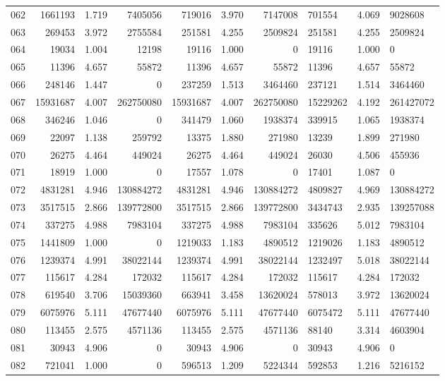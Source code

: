 \begin{longtable}{crrrrrr}
062 & 1661193 & 1.719 & 7405056 & 719016 & 3.970 & 7147008 & 701554 & 4.069 & 9028608 \\
063 & 269453 & 3.972 & 2755584 & 251581 & 4.255 & 2509824 & 251581 & 4.255 & 2509824 \\
064 & 19034 & 1.004 & 12198 & 19116 & 1.000 & 0 & 19116 & 1.000 & 0 \\
065 & 11396 & 4.657 & 55872 & 11396 & 4.657 & 55872 & 11396 & 4.657 & 55872 \\
066 & 248146 & 1.447 & 0 & 237259 & 1.513 & 3464460 & 237121 & 1.514 & 3464460 \\
067 & 15931687 & 4.007 & 262750080 & 15931687 & 4.007 & 262750080 & 15229262 & 4.192 & 261427072 \\
068 & 346246 & 1.046 & 0 & 341479 & 1.060 & 1938374 & 339915 & 1.065 & 1938374 \\
069 & 22097 & 1.138 & 259792 & 13375 & 1.880 & 271980 & 13239 & 1.899 & 271980 \\
070 & 26275 & 4.464 & 449024 & 26275 & 4.464 & 449024 & 26030 & 4.506 & 455936 \\
071 & 18919 & 1.000 & 0 & 17557 & 1.078 & 0 & 17401 & 1.087 & 0 \\
072 & 4831281 & 4.946 & 130884272 & 4831281 & 4.946 & 130884272 & 4809827 & 4.969 & 130884272 \\
073 & 3517515 & 2.866 & 139772800 & 3517515 & 2.866 & 139772800 & 3434743 & 2.935 & 139257088 \\
074 & 337275 & 4.988 & 7983104 & 337275 & 4.988 & 7983104 & 335626 & 5.012 & 7983104 \\
075 & 1441809 & 1.000 & 0 & 1219033 & 1.183 & 4890512 & 1219026 & 1.183 & 4890512 \\
076 & 1239374 & 4.991 & 38022144 & 1239374 & 4.991 & 38022144 & 1232497 & 5.018 & 38022144 \\
077 & 115617 & 4.284 & 172032 & 115617 & 4.284 & 172032 & 115617 & 4.284 & 172032 \\
078 & 619540 & 3.706 & 15039360 & 663941 & 3.458 & 13620024 & 578013 & 3.972 & 13620024 \\
079 & 6075976 & 5.111 & 47677440 & 6075976 & 5.111 & 47677440 & 6075472 & 5.111 & 47677440 \\
080 & 113455 & 2.575 & 4571136 & 113455 & 2.575 & 4571136 & 88140 & 3.314 & 4603904 \\
081 & 30943 & 4.906 & 0 & 30943 & 4.906 & 0 & 30943 & 4.906 & 0 \\
082 & 721041 & 1.000 & 0 & 596513 & 1.209 & 5224344 & 592853 & 1.216 & 5216152 \\

\end{longtable}
